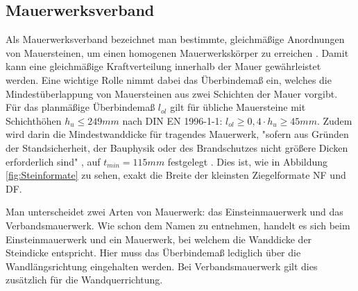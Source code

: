 \subsection{Mauerwerksverband}
\label{basics:Mauerwerksverband}
Als Mauerwerksverband bezeichnet man bestimmte, gleichmäßige Anordnungen von Mauersteinen, um einen homogenen Mauerwerkskörper zu erreichen \cite{Mauerwer39:online}.
Damit kann eine gleichmäßige Kraftverteilung innerhalb der Mauer gewährleistet werden.
Eine wichtige Rolle nimmt dabei das Überbindemaß ein, welches die Mindestüberlappung von Mauersteinen aus zwei Schichten der Mauer vorgibt.
Für das planmäßige Überbindemaß \(l_{ ol }\) gilt für übliche Mauersteine mit Schichthöhen \(h_{ u } \leq 249 mm\) nach DIN EN 1996-1-1: \( l_{ ol } \geq 0,4 · h_{ u } \geq 45 mm\)\cite{Bemessun72:online}\cite{DIN_EN_1996_1_1}.
Zudem wird darin die Mindestwanddicke für tragendes Mauerwerk, "sofern aus Gründen der Standsicherheit, der Bauphysik oder des Brandschutzes nicht größere Dicken erforderlich sind" \cite{Bemessun72:online}, auf  \(t_{ min } = 115 mm\) festgelegt \cite{DIN_EN_1996_1_1}.
Dies ist, wie in Abbildung \ref{fig:Steinformate} zu sehen, exakt die Breite der kleinsten Ziegelformate NF und DF.

Man unterscheidet zwei Arten von Mauerwerk: das Einsteinmauerwerk und das Verbandsmauerwerk.
Wie schon dem Namen zu entnehmen, handelt es sich beim Einsteinmauerwerk und ein Mauerwerk, bei welchem die Wanddicke der Steindicke entspricht.
Hier muss das Überbindemaß lediglich über die Wandlängsrichtung eingehalten werden.
Bei Verbandsmauerwerk gilt dies zusätzlich für die Wandquerrichtung. \cite{05maurer1:online}

